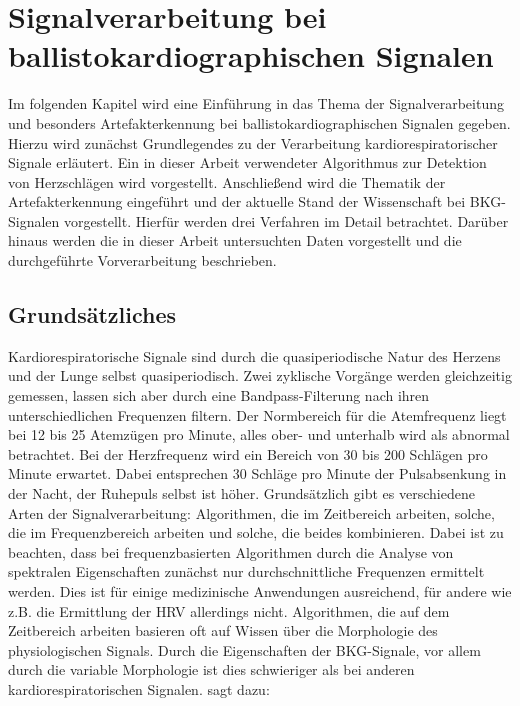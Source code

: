 \chapter{Signalverarbeitung bei ballistokardiographischen Signalen}\label{signalverarbeitung}

Im folgenden Kapitel wird eine Einführung in das Thema der Signalverarbeitung und besonders Artefakterkennung bei ballistokardiographischen Signalen gegeben. Hierzu wird zunächst Grundlegendes zu der Verarbeitung kardiorespiratorischer Signale erläutert. Ein in dieser Arbeit verwendeter Algorithmus zur Detektion von Herzschlägen wird vorgestellt. Anschließend wird die Thematik der Artefakterkennung eingeführt und der aktuelle Stand der Wissenschaft bei \ac{BKG}-Signalen vorgestellt. Hierfür werden drei Verfahren im Detail betrachtet. Darüber hinaus werden die in dieser Arbeit untersuchten Daten vorgestellt und die durchgeführte Vorverarbeitung beschrieben.

\section{Grundsätzliches} %

	Kardiorespiratorische Signale sind durch die quasiperiodische Natur des Herzens und der Lunge selbst quasiperiodisch. Zwei zyklische Vorgänge werden gleichzeitig gemessen, lassen sich aber durch eine Bandpass-Filterung nach ihren unterschiedlichen Frequenzen filtern. Der Normbereich für die Atemfrequenz liegt bei 12 bis 25 Atemzügen pro Minute, alles ober- und unterhalb wird als abnormal betrachtet. Bei der Herzfrequenz wird ein Bereich von 30 bis 200 Schlägen pro Minute erwartet. Dabei entsprechen 30 Schläge pro Minute der Pulsabsenkung in der Nacht, der Ruhepuls selbst ist höher. Grundsätzlich gibt es verschiedene Arten der Signalverarbeitung: Algorithmen, die im Zeitbereich arbeiten, solche, die im Frequenzbereich arbeiten und solche, die beides kombinieren. Dabei ist zu beachten, dass bei frequenzbasierten Algorithmen durch die Analyse von spektralen Eigenschaften zunächst nur durchschnittliche Frequenzen ermittelt werden. Dies ist für einige medizinische Anwendungen ausreichend, für andere wie z.B. die Ermittlung der \ac{HRV} allerdings nicht. Algorithmen, die auf dem Zeitbereich arbeiten basieren oft auf Wissen über die Morphologie des physiologischen Signals. Durch die Eigenschaften der \ac{BKG}-Signale, vor allem durch die variable Morphologie ist dies schwieriger als bei anderen kardiorespiratorischen Signalen. \citeauthor{Paalasmaa2015} sagt dazu:

